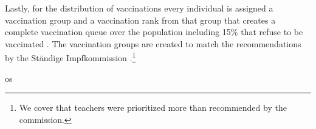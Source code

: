 Lastly, for the distribution of vaccinations every individual is assigned a vaccination
group and a vaccination rank from that group that creates a complete vaccination queue
over the population including 15\% that refuse to be vaccinated \citep{RKI2021}. The
vaccination groups are created to match the recommendations by the Ständige
Impfkommission \citep{VygenBonnet2020}.\footnote{We cover that teachers were prioritized
more than recommended by the commission.}





\FloatBarrier
os